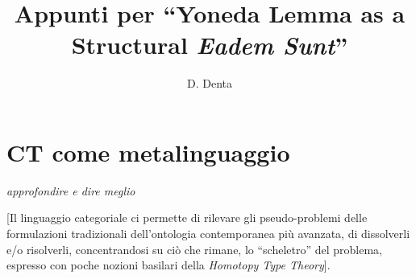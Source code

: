 \documentclass[a4paper, 11pt]{article}
\begin{document}
\title{Appunti per ``Yoneda Lemma as a Structural \textit{Eadem Sunt}''}
\author{D. Denta}
\maketitle

\tableofcontents
\section{CT come metalinguaggio} 

\textit{approfondire e dire meglio} 


 [Il linguaggio categoriale ci permette di rilevare gli pseudo-problemi delle formulazioni tradizionali dell'ontologia contemporanea più avanzata, di dissolverli e/o risolverli, concentrandosi su ciò che rimane, lo ``scheletro'' del problema, espresso con poche nozioni basilari della \textit{Homotopy Type Theory}].
\end{document}
